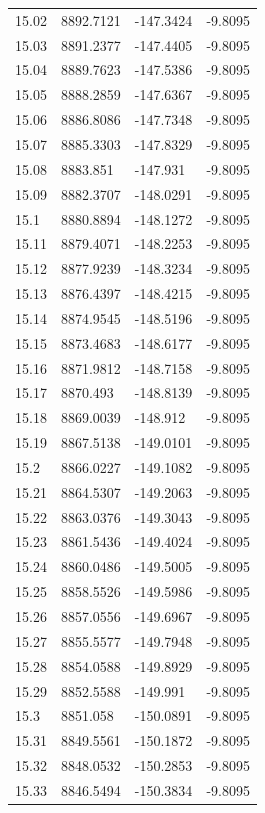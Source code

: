\begin{table}[H]
\begin{tabular}{llll}
15.02 & 8892.7121 & -147.3424 & -9.8095 \\
15.03 & 8891.2377 & -147.4405 & -9.8095 \\
15.04 & 8889.7623 & -147.5386 & -9.8095 \\
15.05 & 8888.2859 & -147.6367 & -9.8095 \\
15.06 & 8886.8086 & -147.7348 & -9.8095 \\
15.07 & 8885.3303 & -147.8329 & -9.8095 \\
15.08 & 8883.851 & -147.931 & -9.8095 \\
15.09 & 8882.3707 & -148.0291 & -9.8095 \\
15.1 & 8880.8894 & -148.1272 & -9.8095 \\
15.11 & 8879.4071 & -148.2253 & -9.8095 \\
15.12 & 8877.9239 & -148.3234 & -9.8095 \\
15.13 & 8876.4397 & -148.4215 & -9.8095 \\
15.14 & 8874.9545 & -148.5196 & -9.8095 \\
15.15 & 8873.4683 & -148.6177 & -9.8095 \\
15.16 & 8871.9812 & -148.7158 & -9.8095 \\
15.17 & 8870.493 & -148.8139 & -9.8095 \\
15.18 & 8869.0039 & -148.912 & -9.8095 \\
15.19 & 8867.5138 & -149.0101 & -9.8095 \\
15.2 & 8866.0227 & -149.1082 & -9.8095 \\
15.21 & 8864.5307 & -149.2063 & -9.8095 \\
15.22 & 8863.0376 & -149.3043 & -9.8095 \\
15.23 & 8861.5436 & -149.4024 & -9.8095 \\
15.24 & 8860.0486 & -149.5005 & -9.8095 \\
15.25 & 8858.5526 & -149.5986 & -9.8095 \\
15.26 & 8857.0556 & -149.6967 & -9.8095 \\
15.27 & 8855.5577 & -149.7948 & -9.8095 \\
15.28 & 8854.0588 & -149.8929 & -9.8095 \\
15.29 & 8852.5588 & -149.991 & -9.8095 \\
15.3 & 8851.058 & -150.0891 & -9.8095 \\
15.31 & 8849.5561 & -150.1872 & -9.8095 \\
15.32 & 8848.0532 & -150.2853 & -9.8095 \\
15.33 & 8846.5494 & -150.3834 & -9.8095 \\

\end{tabular}
\end{table}
